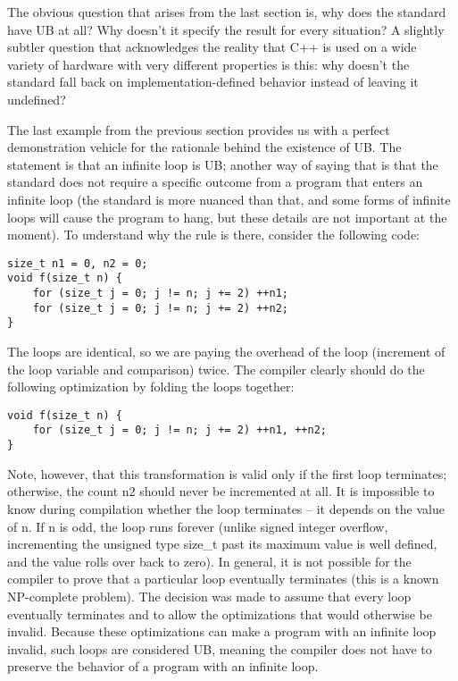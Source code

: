 The obvious question that arises from the last section is, why does the standard have UB at all? Why doesn't it specify the result for every situation? A slightly subtler question that acknowledges the reality that C++ is used on a wide variety of hardware with very different properties is this: why doesn't the standard fall back on implementation-defined behavior instead of leaving it undefined?

The last example from the previous section provides us with a perfect demonstration vehicle for the rationale behind the existence of UB. The statement is that an infinite loop is UB; another way of saying that is that the standard does not require a specific outcome from a program that enters an infinite loop (the standard is more nuanced than that, and some forms of infinite loops will cause the program to hang, but these details are not important at the moment). To understand why the rule is there, consider the following code:

\begin{lstlisting}[style=styleCXX]
size_t n1 = 0, n2 = 0;
void f(size_t n) {
	for (size_t j = 0; j != n; j += 2) ++n1; 
	for (size_t j = 0; j != n; j += 2) ++n2;
}
\end{lstlisting}

The loops are identical, so we are paying the overhead of the loop (increment of the loop variable and comparison) twice. The compiler clearly should do the following optimization by folding the loops together:

\begin{lstlisting}[style=styleCXX]
void f(size_t n) {
	for (size_t j = 0; j != n; j += 2) ++n1, ++n2;
}
\end{lstlisting}

Note, however, that this transformation is valid only if the first loop terminates; otherwise, the count n2 should never be incremented at all. It is impossible to know during compilation whether the loop terminates – it depends on the value of n. If n is odd, the loop runs forever (unlike signed integer overflow, incrementing the unsigned type size\_t past its maximum value is well defined, and the value rolls over back to zero). In general, it is not possible for the compiler to prove that a particular loop eventually terminates (this is a known NP-complete problem). The decision was made to assume that every loop eventually terminates and to allow the optimizations that would otherwise be invalid. Because these optimizations can make a program with an infinite loop invalid, such loops are considered UB, meaning the compiler does not have to preserve the behavior of a program with an infinite loop.

